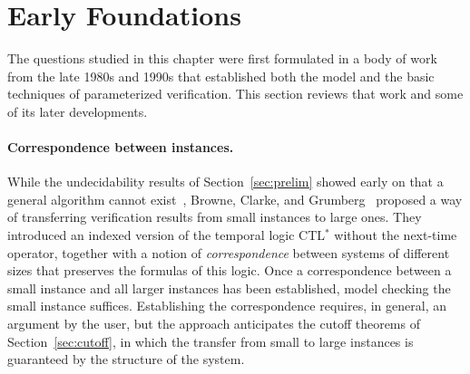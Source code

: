 \section{Early Foundations}
\label{sec:early}

The questions studied in this chapter were first formulated in a body of work
from the late 1980s and 1990s that established both the model and the basic
techniques of parameterized verification. This section reviews that work and
some of its later developments.

\paragraph{Correspondence between instances.}
While the undecidability results of Section~\ref{sec:prelim} showed early on
that a general algorithm cannot exist~\cite{AK86,Suz88}, Browne, Clarke, and
Grumberg~\cite{BCG89} proposed a way of transferring
verification results from small instances to large ones. They introduced an
indexed version of the temporal logic CTL$^*$ without the next-time operator,
together with a notion of \emph{correspondence} between systems of different
sizes that preserves the formulas of this logic. Once a correspondence between
a small instance and all larger instances has been established, model checking
the small instance suffices. Establishing the correspondence requires, in
general, an argument by the user, but the approach anticipates the cutoff
theorems of Section~\ref{sec:cutoff}, in which the transfer from small to large
instances is guaranteed by the structure of the system.

